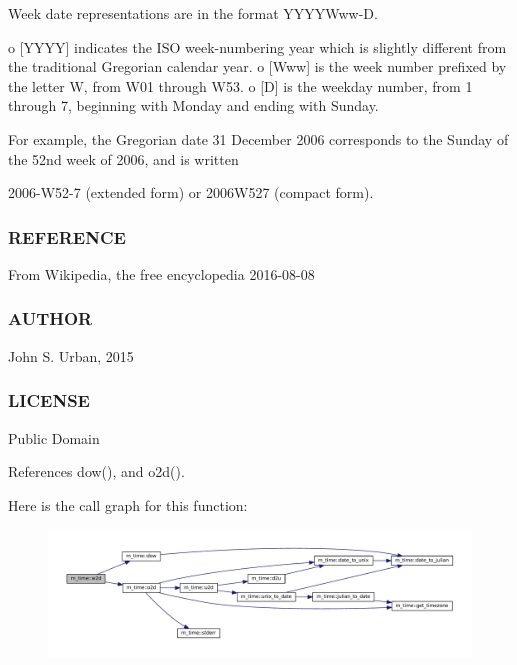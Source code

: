 Week date representations are in the format Y\+Y\+Y\+Y\+Www-\/D.

o \mbox{[}Y\+Y\+YY\mbox{]} indicates the I\+SO week-\/numbering year which is slightly different from the traditional Gregorian calendar year. o \mbox{[}Www\mbox{]} is the week number prefixed by the letter W, from W01 through W53. o \mbox{[}D\mbox{]} is the weekday number, from 1 through 7, beginning with Monday and ending with Sunday.

For example, the Gregorian date 31 December 2006 corresponds to the Sunday of the 52nd week of 2006, and is written

2006-\/\+W52-\/7 (extended form) or 2006\+W527 (compact form).

\subsubsection*{R\+E\+F\+E\+R\+E\+N\+CE}

From Wikipedia, the free encyclopedia 2016-\/08-\/08

\subsubsection*{A\+U\+T\+H\+OR}

John S. Urban, 2015 \subsubsection*{L\+I\+C\+E\+N\+SE}

Public Domain 

References dow(), and o2d().

Here is the call graph for this function\+:\nopagebreak
\begin{figure}[H]
\begin{center}
\leavevmode
\includegraphics[width=350pt]{namespacem__time_ac0ec48db8d508bfa23fe4b20c9d1c5a3_cgraph}
\end{center}
\end{figure}
\mbox{\label{namespacem__time_ac43e082c8ffd7687c4fc91beddc15720}} 
